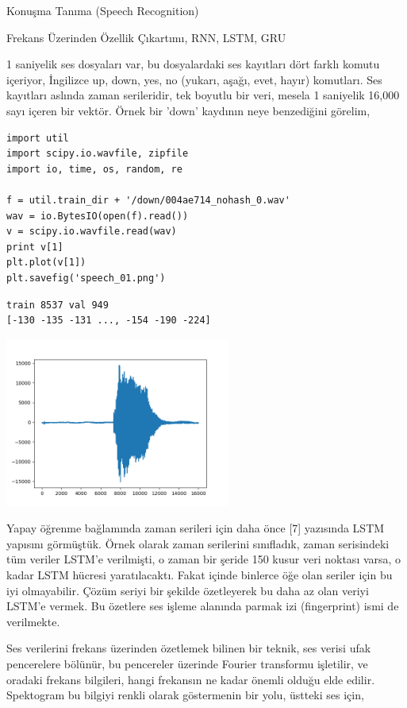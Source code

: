 \documentclass[12pt,fleqn]{article}\usepackage{../../common}
\begin{document}
Konuşma Tanıma (Speech Recognition)

Frekans Üzerinden Özellik Çıkartımı, RNN, LSTM, GRU

1 saniyelik ses dosyaları var, bu dosyalardaki ses kayıtları dört farklı
komutu içeriyor, İngilizce up, down, yes, no (yukarı, aşağı, evet, hayır)
komutları. Ses kayıtları aslında zaman serileridir, tek boyutlu bir veri,
mesela 1 saniyelik 16,000 sayı içeren bir vektör. Örnek bir 'down' kaydının
neye benzediğini görelim,

\begin{verbatim}
import util
import scipy.io.wavfile, zipfile
import io, time, os, random, re

f = util.train_dir + '/down/004ae714_nohash_0.wav'
wav = io.BytesIO(open(f).read())
v = scipy.io.wavfile.read(wav)
print v[1]
plt.plot(v[1])
plt.savefig('speech_01.png')
\end{verbatim}

\begin{verbatim}
train 8537 val 949
[-130 -135 -131 ..., -154 -190 -224]
\end{verbatim}

\includegraphics[width=20em]{speech_01.png}

Yapay öğrenme bağlamında zaman serileri için daha önce [7] yazısında LSTM
yapısını görmüştük. Örnek olarak zaman serilerini sınıfladık, zaman
serisindeki tüm veriler LSTM'e verilmişti, o zaman bir şeride 150 kusur
veri noktası varsa, o kadar LSTM hücresi yaratılacaktı. Fakat içinde
binlerce öğe olan seriler için bu iyi olmayabilir. Çözüm seriyi bir şekilde
özetleyerek bu daha az olan veriyi LSTM'e vermek. Bu özetlere ses işleme
alanında parmak izi (fingerprint) ismi de verilmekte.

Ses verilerini frekans üzerinden özetlemek bilinen bir teknik, ses verisi
ufak pencerelere bölünür, bu pencereler üzerinde Fourier transformu
işletilir, ve oradaki frekans bilgileri, hangi frekansın ne kadar önemli
olduğu elde edilir. Spektogram bu bilgiyi renkli olarak göstermenin bir
yolu, üstteki ses için,
\end{document}
